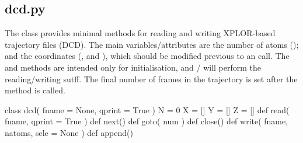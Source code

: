 \normalsize
\subsection[dcd]{dcd.py}
The class  provides
minimal methods for reading and writing XPLOR-based trajectory files (DCD). The main variables/attributes are
the number of atoms (); and the coordinates (,  and ), which should
be modified previous to an  call. The  and  methods are intended
only for initialisation, and / will perform the reading/writing sutff.
The final number of frames in the trajectory is set after the  method is called.\\
\begin{pyglist}[language=python,fvset={frame=single}]
class dcd( fname = None, qprint = True )
    N = 0
    X = []
    Y = []
    Z = []
    def read( fname, qprint = True )
    def next()
    def goto( num )
    def close()
    def write( fname, natoms, sele = None )
    def append()
\end{pyglist}
